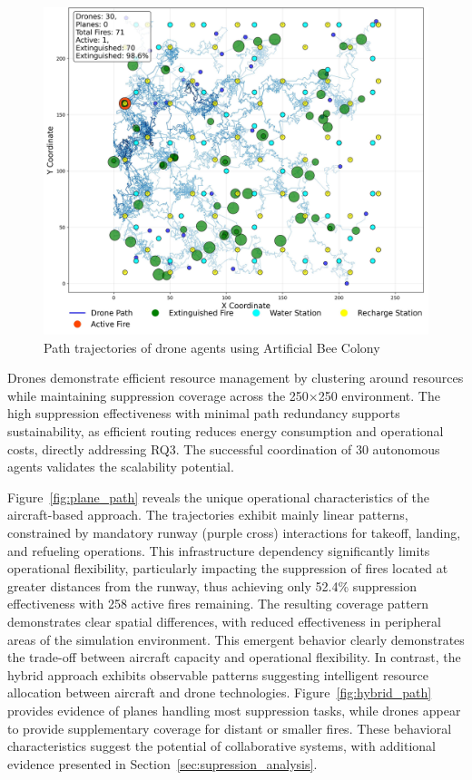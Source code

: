 \documentclass[11pt, a4paper]{article}
\begin{document}
\begin{figure}[htbp]
    \centering
    \includegraphics[width=0.9\linewidth]{figures/Artificial_Bee_Colony_agent_paths.jpeg}
    \caption{Path trajectories of drone agents using Artificial Bee Colony}
    \label{fig:abc}
\end{figure}

Drones demonstrate efficient resource management by clustering around resources while maintaining suppression coverage across the 250×250 environment. The high suppression effectiveness with minimal path redundancy supports sustainability, as efficient routing reduces energy consumption and operational costs, directly addressing RQ3. The successful coordination of 30 autonomous agents validates the scalability potential.

Figure~\ref{fig:plane_path} reveals the unique operational characteristics of the aircraft-based approach. The trajectories exhibit mainly linear patterns, constrained by mandatory runway (purple cross) interactions for takeoff, landing, and refueling operations. This infrastructure dependency significantly limits operational flexibility, particularly impacting the suppression of fires located at greater distances from the runway, thus achieving only 52.4\% suppression effectiveness with 258 active fires remaining. The resulting coverage pattern demonstrates clear spatial differences, with reduced effectiveness in peripheral areas of the simulation environment. This emergent behavior clearly demonstrates the trade-off between aircraft capacity and operational flexibility.
In contrast, the hybrid approach exhibits observable patterns suggesting intelligent resource allocation between aircraft and drone technologies. Figure~\ref{fig:hybrid_path} provides evidence of planes handling most suppression tasks, while drones appear to provide supplementary coverage for distant or smaller fires. These behavioral characteristics suggest the potential of collaborative systems, with additional evidence presented in Section~\ref{sec:supression_analysis}.
\end{document}
